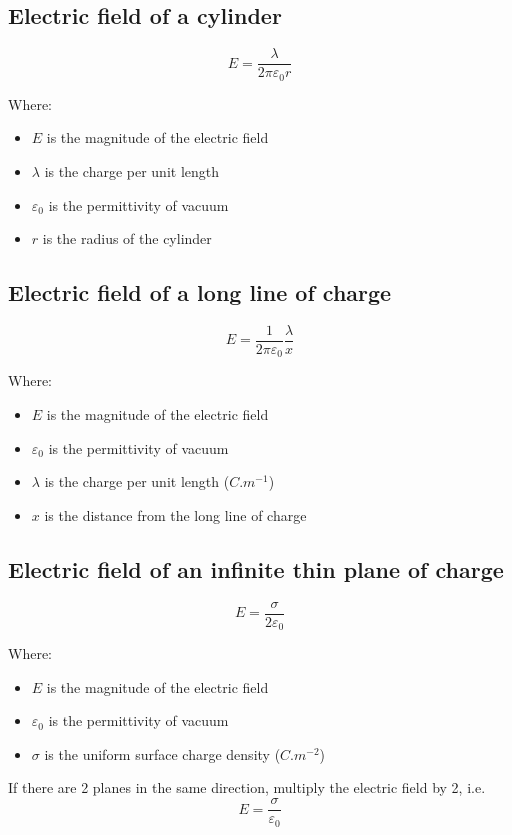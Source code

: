 \documentclass[11pt]{article}
\begin{document}
\newpage

\subsection{Electric field of a cylinder}
\label{sec:org095127e}
\[E = \frac{\lambda}{2 \pi \varepsilon_0 r}\]

Where:
\begin{itemize}
\item \(E\) is the magnitude of the electric field
\item \(\lambda\) is the charge per unit length
\item \(\varepsilon_0\) is the permittivity of vacuum
\item \(r\) is the radius of the cylinder
\end{itemize}

\subsection{Electric field of a long line of charge}
\label{sec:orgb7b067a}
\[E = \frac{1}{2 \pi \varepsilon_0} \frac{\lambda}{x}\]

Where:
\begin{itemize}
\item \(E\) is the magnitude of the electric field
\item \(\varepsilon_0\) is the permittivity of vacuum
\item \(\lambda\) is the charge per unit length (\(\unit{C.m^{-1}}\))
\item \(x\) is the distance from the long line of charge
\end{itemize}

\subsection{Electric field of an infinite thin plane of charge}
\label{sec:orgcd917f5}
\[E = \frac{\sigma}{2 \varepsilon_0}\]

Where:
\begin{itemize}
\item \(E\) is the magnitude of the electric field
\item \(\varepsilon_0\) is the permittivity of vacuum
\item \(\sigma\) is the uniform surface charge density (\(\unit{C.m^{-2}}\))
\end{itemize}

If there are 2 planes in the same direction, multiply the electric field by 2, i.e.
\[E = \frac{\sigma}{\varepsilon_0}\]
\end{document}
